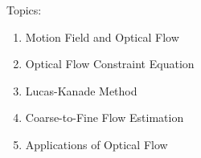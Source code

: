 \begin{frame}
  \begin{columns}
    \begin{column}{0.5\textwidth}
      \begin{center}
        \end{center}
    \end{column}
    \begin{column}{0.5\textwidth}  %
      \begin{center}
      \end{center}
    \end{column}
  \end{columns}

  Topics:
  \begin{enumerate}
  \item Motion Field and Optical Flow
  \item Optical Flow Constraint Equation
  \item Lucas-Kanade Method
  \item Coarse-to-Fine Flow Estimation
  \item Applications of Optical Flow
  \end{enumerate}
\end{frame}


